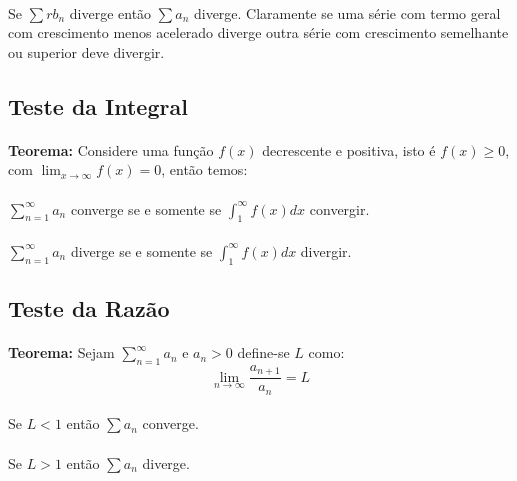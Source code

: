\documentclass{article}
\begin{document}
            \paragraph{}Se $\sum rb_{n}$ diverge então $\sum a_{n}$ diverge. Claramente se uma série com termo geral com crescimento menos acelerado diverge outra série com crescimento semelhante ou superior deve divergir.

        \subsection{Teste da Integral}
            \paragraph{}\textbf{Teorema:} Considere uma função $f(x)$ decrescente e positiva, isto é $f(x) \ge 0$,  com $\lim_{x\to\infty}f(x)=0$, então temos:
            \paragraph{}$\sum\limits_{n=1}^{\infty}a_{n}$ converge se e somente se $\int_{1}^{\infty}f(x)dx$ convergir.
            \paragraph{}$\sum\limits_{n=1}^{\infty}a_{n}$ diverge se e somente se $\int_{1}^{\infty}f(x)dx$ divergir.
            
        \subsection{Teste da Razão}
            \paragraph{}\textbf{Teorema:} Sejam $\sum\limits_{n=1}^{\infty}a_{n}$ e $a_{n}>0$ define-se $L$ como:
                \begin{equation}
                    \lim_{n\to\infty}\frac{a_{n+1}}{a_{n}}=L
                \end{equation}
            \paragraph{}Se $L<1$ então $\sum a_{n}$ converge.
            \paragraph{}Se $L>1$ então $\sum a_{n}$ diverge.
\end{document}
